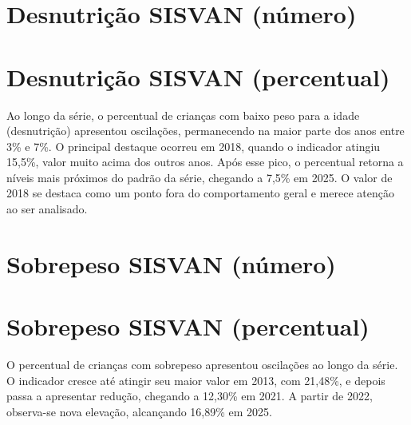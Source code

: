
\section{Desnutrição SISVAN (número)}


\section{Desnutrição SISVAN (percentual)}


Ao longo da série, o percentual de crianças com baixo peso para a idade (desnutrição) apresentou oscilações, permanecendo na maior parte dos anos entre 3\% e 7\%. O principal destaque ocorreu em 2018, quando o indicador atingiu 15,5\%, valor muito acima dos outros anos. Após esse pico, o percentual retorna a níveis mais próximos do padrão da série, chegando a 7,5\% em 2025. O valor de 2018 se destaca como um ponto fora do comportamento geral e merece atenção ao ser analisado.


\section{Sobrepeso SISVAN (número)}


\section{Sobrepeso SISVAN (percentual)}


O percentual de crianças com sobrepeso apresentou oscilações ao longo da série. O indicador cresce até atingir seu maior valor em 2013, com 21,48\%, e depois passa a apresentar redução, chegando a 12,30\% em 2021. A partir de 2022, observa-se nova elevação, alcançando 16,89\% em 2025.


